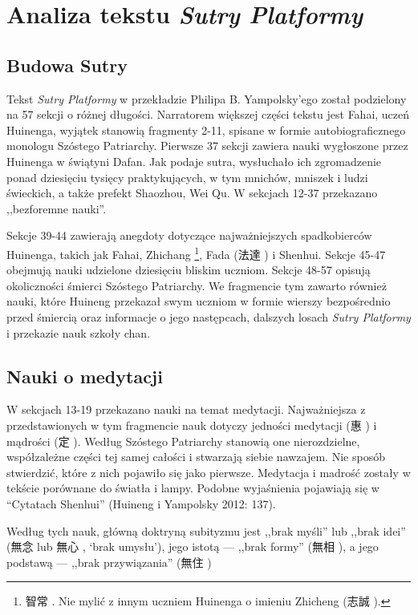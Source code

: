 \chapter{Analiza tekstu \textit{Sutry Platformy}}

\section{Budowa Sutry}
Tekst \textit{Sutry Platformy} w przekładzie Philipa B. Yampolsky'ego został podzielony na 57 sekcji o różnej długości.
Narratorem większej części tekstu jest Fahai, uczeń Huinenga, wyjątek stanowią fragmenty 2-11, spisane w formie autobiograficznego monologu Szóstego Patriarchy.
Pierwsze 37 sekcji zawiera nauki wygłoszone przez Huinenga w świątyni Dafan.
Jak podaje sutra, wysłuchało ich zgromadzenie ponad dziesięciu tysięcy praktykujących, w tym mnichów, mniszek i ludzi świeckich, a także prefekt Shaozhou, Wei Qu.
W sekcjach 12-37 przekazano ,,bezforemne nauki''.

Sekcje 39-44 zawierają anegdoty dotyczące najważniejszych spadkobierców Huinenga, takich jak Fahai, Zhichang%
\footnote{智常 . Nie mylić z innym uczniem Huinenga o imieniu Zhicheng (志誠 ).\label{ZhiChangChengDisambiguation}}, Fada (法達 ) i Shenhui.
Sekcje 45-47 obejmują nauki udzielone dziesięciu bliskim uczniom.
Sekcje 48-57 opisują okoliczności śmierci Szóstego Patriarchy.
We fragmencie tym zawarto również nauki, które Huineng przekazał swym uczniom w formie wierszy bezpośrednio przed śmiercią oraz informacje o jego następcach, dalszych losach \textit{Sutry Platformy} i przekazie nauk szkoły chan.

\section{Nauki o medytacji}
W sekcjach 13-19 przekazano nauki na temat medytacji.
Najważniejsza z przedstawionych w tym fragmencie nauk dotyczy jedności medytacji (惠 ) i mądrości (定 ).\label{DingHui}
Według Szóstego Patriarchy stanowią one nierozdzielne, współzależne części tej samej całości i stwarzają siebie nawzajem.
Nie sposób stwierdzić, które z nich pojawiło się jako pierwsze.
Medytacja i madrość zostały w tekście porównane do światła i lampy.
Podobne wyjaśnienia pojawiają się w ``Cytatach Shenhui''
(Huineng i Yampolsky 2012: 137).

Według tych nauk, główną doktryną subityzmu jest ,,brak myśli'' lub ,,brak idei'' (無念  lub 無心 , `brak umysłu'), jego istotą --- ,,brak formy'' (無相 ), a jego podstawą --- ,,brak przywiązania'' (無住 )\ibid

